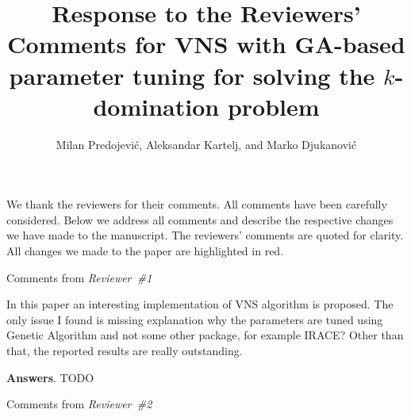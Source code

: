 \documentclass [11pt]{scrartcl}
\title{\Large{Response to the Reviewers' Comments for   VNS with GA-based parameter tuning for solving the $k$-domination problem} }
\author{{Milan Predojević}, {Aleksandar Kartelj}, and {Marko Djukanović} }
\begin{document}
\maketitle 

We thank the reviewers for their   comments. All comments have been carefully considered. Below we address all comments and describe the respective changes we have made to the manuscript. The reviewers' comments are quoted for clarity. All changes we made to the paper are highlighted in red.
  
\begin{center} 
Comments from \textit{Reviewer\ \#1}
\end{center}

\begin{leftbar}

In this paper an interesting implementation of VNS algorithm is proposed. The only issue I found is missing explanation why the parameters are tuned using Genetic Algorithm and not some other package, for example IRACE? Other than that, the reported results are really outstanding.

\end{leftbar}
\textbf{Answers}.  TODO

 
 
 
\begin{center} 
	Comments from \textit{Reviewer\ \#2}
\end{center}
\end{document}

